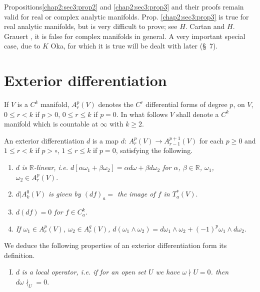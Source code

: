 \begin{remark*}
  Propositions\pageoriginale \ref{chap2:sec3:prop2} and
  \ref{chap2:sec3:prop3} and their proofs remain valid for real or 
  complex analytic manifolds. Prop. \ref{chap2:sec3:prop3} is true for
  real analytic 
  manifolds, but is very difficult to prove; see $H$. Cartan \cite{6} and
  $H$. Grauert \cite{13}, it is false for complex manifolds in general. A
  very important special case, due to $K$ Oka, for which it is true
  will be dealt with later (\S\ 7). 
\end{remark*}

\section{Exterior differentiation}\label{chap2:sec4} %
 
If $V$ is a $C^k$ manifold, $A^p_r (V)$ denotes the $C^r$ differential
forms of degree $p$, on $V$, $0 \leq r < k $  if $p > 0$, $0 \leq r
\leq k$ if $p = 0$. In what follows $V$ shall denote a $C^k$ manifold
which is countable at $\infty$ with $k \geq 2$. 

\begin{defi*} 
  An exterior differentiation $d$ is a map $d$: $A^p_r (V) \to
  A^{p+1}_{r-1} (V)$ for each $p \geq 0$ and  $1 \leq r < k$ if $p >
  \circ$, $ 1 \leq r \leq k$ if $p = 0$, satisfying the following. 
  \begin{enumerate}[1)]
  \item $d$ \textit{is $\mathbb{R}$-linear, i.e. $d \left[ \alpha
      \omega_1 + \beta \omega_2 \right] = \alpha d \omega + \beta d
    \omega_2 $ for $\alpha$, $\beta \in \mathbb{R}$, $\omega_1$,
    $\omega_2 \in A^p_r (V)$}. 
  \item \textit{$d | A^0_k (V)$ is given by $(df)_a =$ the image of
    $f$ in $T^*_a (V)$}. 
  \item \textit{$d (df) = 0$ for $f \in C^k_a$}.
  \item \textit{If $\omega_1 \in A^p_r (V)$, $\omega_2 \in A^q_r (V)$,
    $d (\omega_1 \wedge \omega_2) = d \omega_1 \wedge \omega_2 +
    (-1)^p \omega_1 \wedge d \omega_2$}. 
  \end{enumerate}
\end{defi*}

We deduce the  following properties of an exterior differentiation
form its definition. 
\begin{enumerate}[I.]
\item $d$ \textit{is a local operator, i.e. if for an open set $U$ we
  have $\omega \nmid U = 0$. then $d \omega \nmid_ U = 0$}. 
\end{enumerate}

